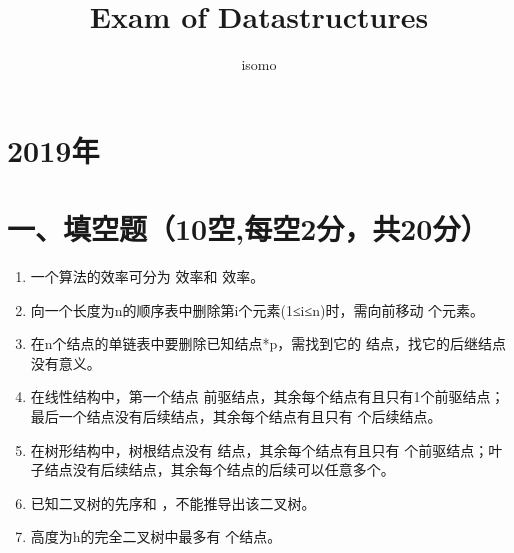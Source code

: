 \documentclass{../../note}
\title{Exam of Datastructures}
\author{isomo}
\begin{document}
\fontsize{12pt}{14.4pt}\selectfont

\maketitle


\section*{2019年}

\vspace{1cm}

\section*{一、填空题（10空,每空2分，共20分）}

\begin{enumerate}
\item 一个算法的效率可分为 \underline{\hspace{2cm}} 效率和 \underline{\hspace{2cm}} 效率。

\item 向一个长度为n的顺序表中删除第i个元素(1≤i≤n)时，需向前移动 \underline{\hspace{2cm}} 个元素。

\item 在n个结点的单链表中要删除已知结点*p，需找到它的 \underline{\hspace{2cm}} 结点，找它的后继结点没有意义。

\item 在线性结构中，第一个结点 \underline{\hspace{2cm}} 前驱结点，其余每个结点有且只有1个前驱结点；最后一个结点没有后续结点，其余每个结点有且只有 \underline{\hspace{2cm}} 个后续结点。

\item 在树形结构中，树根结点没有 \underline{\hspace{2cm}} 结点，其余每个结点有且只有 \underline{\hspace{2cm}} 个前驱结点；叶子结点没有后续结点，其余每个结点的后续可以任意多个。

\item 已知二叉树的先序和 \underline{\hspace{2cm}}，不能推导出该二叉树。

\item 高度为h的完全二叉树中最多有 \underline{\hspace{2cm}} 个结点。
\end{enumerate}
\end{document}
